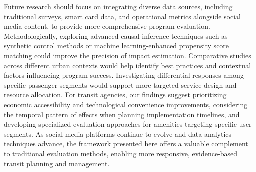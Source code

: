 \documentclass[a4paper,fleqn,12pt]{cas-sc}
\begin{document}
Future research should focus on integrating diverse data sources, including traditional surveys, smart card data, and operational metrics alongside social media content, to provide more comprehensive program evaluation. Methodologically, exploring advanced causal inference techniques such as synthetic control methods or machine learning-enhanced propensity score matching could improve the precision of impact estimation. Comparative studies across different urban contexts would help identify best practices and contextual factors influencing program success. Investigating differential responses among specific passenger segments would support more targeted service design and resource allocation. For transit agencies, our findings suggest prioritizing economic accessibility and technological convenience improvements, considering the temporal pattern of effects when planning implementation timelines, and developing specialized evaluation approaches for amenities targeting specific user segments. As social media platforms continue to evolve and data analytics techniques advance, the framework presented here offers a valuable complement to traditional evaluation methods, enabling more responsive, evidence-based transit planning and management.



%
\nolinenumbers



\end{document}
